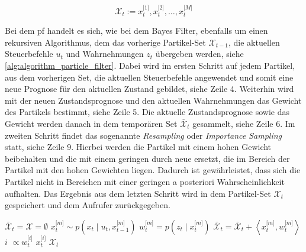 \begin{equation}
\mathcal{X}_t := x^{\lbrack 1 \rbrack}_t, x^{\lbrack 2 \rbrack}_t, \ldots, x^{\lbrack M \rbrack}_t \label{eq:particle_filter_particle_set}
\end{equation}

Bei dem \Gls{pf} handelt es sich, wie bei dem Bayes Filter, ebenfalls um einen rekursiven Algorithmus, dem das vorherige Partikel-Set $\mathcal{X}_{t-1}$, die aktuellen Steuerbefehle $u_t$ und Wahrnehmungen $z_t$ übergeben werden, siehe \autoref{alg:algorithm_particle_filter}. Dabei wird im ersten Schritt auf jedem Partikel, aus dem vorherigen Set, die aktuellen Steuerbefehle angewendet und somit eine neue Prognose für den aktuellen Zustand gebildet, siehe Zeile 4. Weiterhin wird mit der neuen Zustandsprognose und den aktuellen Wahrnehmungen das Gewicht des Partikels bestimmt, siehe Zeile 5. Die aktuelle Zustandsprognose sowie das Gewicht werden danach in dem temporären Set $\overline{\mathcal{X}}_t$ gesammelt, siehe Zeile 6. Im zweiten Schritt findet das sogenannte \textit{Resampling} oder \textit{Importance Sampling} statt, siehe Zeile 9. Hierbei werden die Partikel mit einem hohen Gewicht beibehalten und die mit einem geringen durch neue ersetzt, die im Bereich der Partikel mit den hohen Gewichten liegen. Dadurch ist gewährleistet, dass sich die Partikel nicht in Bereichen mit einer geringen a posteriori Wahrscheinlichkeit aufhalten. Das Ergebnis aus dem letzten Schritt wird in dem Partikel-Set $\mathcal{X}_t$ gespeichert und dem Aufrufer zurückgegeben.


\begin{algorithm}
\begin{onehalfspacing}
	\DontPrintSemicolon
	{
		$\bar{\mathcal{X}}_t = \mathcal{X} = \emptyset$\;
		{
			\KwSample $x^{\lbrack m \rbrack}_t \sim p(x_t \mid u_t, x^{\lbrack m \rbrack}_{t-1})$\;
			$w^{\lbrack m \rbrack}_t = p(z_t \mid x^{\lbrack m \rbrack}_t)$\;
			$\bar{\mathcal{X}}_t = \bar{\mathcal{X}}_t + \left \langle x^{\lbrack m \rbrack}_t, w^{\lbrack m \rbrack}_t \right \rangle$\;
		}
		{
			\KwDraw $i$ \KwWithProb $\propto w^{\lbrack i \rbrack}_t$\;
			\KwAdd $x^{\lbrack i \rbrack}_t$ \KwTo $\mathcal{X}_t$\;
		}
	}
\label{alg:algorithm_particle_filter}
\end{onehalfspacing}
\end{algorithm}


